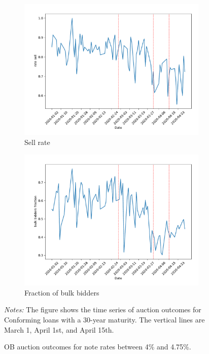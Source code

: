 \documentclass[11pt,a4paper]{article}
\begin{document}
\begin{figure}[h]
\begin{subfigure}[b]{0.49\textwidth}
      \includegraphics[width=0.998\textwidth]{../results/figures/dummy_sell_any_mean_mat30_loan1_timeseries_nr_4_4.75.pdf}
      \caption{ Sell rate}
     \end{subfigure}
     \begin{subfigure}[b]{0.49\textwidth}
      \includegraphics[width=0.998\textwidth]{../results/figures/bulk_bidders_fraction_mean_mat30_loan1_timeseries_nr_4_4.75.pdf}
      \caption{ Fraction of bulk bidders}
     \end{subfigure}
     \caption{OB auction outcomes for note rates between 4\% and 4.75\%. } 
   \begin{minipage}{\textwidth}
      \footnotesize{\textit{Notes:} The figure shows the time series of auction outcomes for Conforming loans with a 30-year maturity. The vertical lines are March 1, April 1st, and April 15th.  } 
      \end{minipage}
\end{figure}
\end{document}

